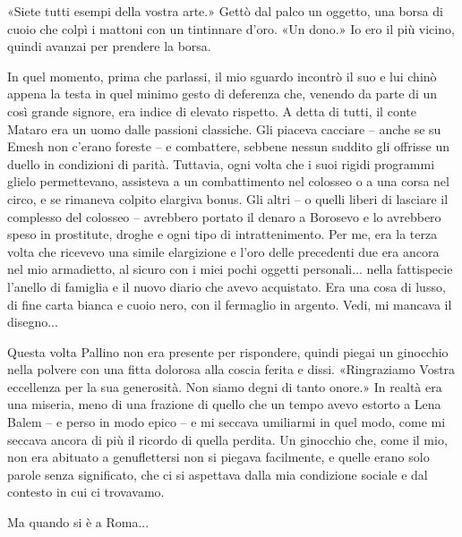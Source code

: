«Siete tutti esempi della vostra arte.» Gettò dal palco un oggetto, una
borsa di cuoio che colpì i mattoni con un tintinnare d'oro. «Un dono.»
Io ero il più vicino, quindi avanzai per prendere la borsa.

In quel momento, prima che parlassi, il mio sguardo incontrò il suo e
lui chinò appena la testa in quel minimo gesto di deferenza che, venendo
da parte di un così grande signore, era indice di elevato rispetto. A
detta di tutti, il conte Mataro era un uomo dalle passioni classiche.
Gli piaceva cacciare -- anche se su Emesh non c'erano foreste -- e
combattere, sebbene nessun suddito gli offrisse un duello in condizioni
di parità. Tuttavia, ogni volta che i suoi rigidi programmi glielo
permettevano, assisteva a un combattimento nel colosseo o a una corsa
nel circo, e se rimaneva colpito elargiva bonus. Gli altri -- o quelli
liberi di lasciare il complesso del colosseo -- avrebbero portato il
denaro a Borosevo e lo avrebbero speso in prostitute, droghe e ogni tipo
di intrattenimento. Per me, era la terza volta che ricevevo una simile
elargizione e l'oro delle precedenti due era ancora nel mio armadietto,
al sicuro con i miei pochi oggetti personali... nella fattispecie
l'anello di famiglia e il nuovo diario che avevo acquistato. Era una
cosa di lusso, di fine carta bianca e cuoio nero, con il fermaglio in
argento. Vedi, mi mancava il disegno...

Questa volta Pallino non era presente per rispondere, quindi piegai un
ginocchio nella polvere con una fitta dolorosa alla coscia ferita e
dissi. «Ringraziamo Vostra eccellenza per la sua generosità. Non siamo
degni di tanto onore.» In realtà era una miseria, meno di una frazione
di quello che un tempo avevo estorto a Lena Balem -- e perso in modo
epico -- e mi seccava umiliarmi in quel modo, come mi seccava ancora di
più il ricordo di quella perdita. Un ginocchio che, come il mio, non era
abituato a genuflettersi non si piegava facilmente, e quelle erano solo
parole senza significato, che ci si aspettava dalla mia condizione
sociale e dal contesto in cui ci trovavamo.

Ma quando si è a Roma...

\begin{figure}
	\centering
	\def\svgwidth{\columnwidth}
	\scalebox{0.2}{}
\end{figure}

